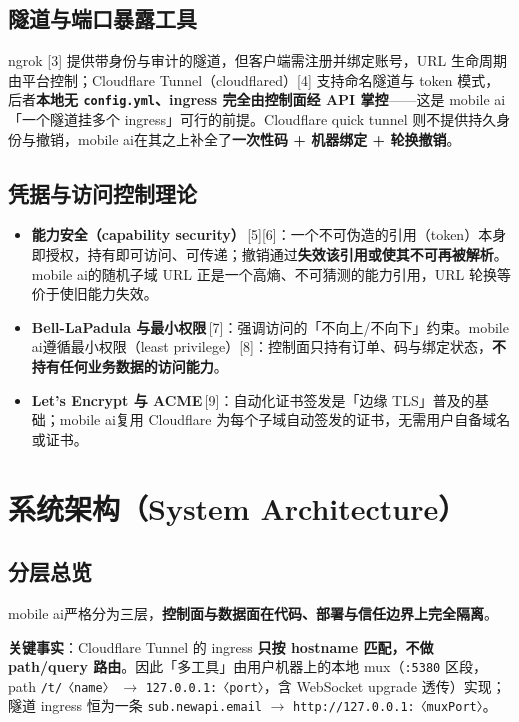 \documentclass[10pt,a4paper]{article}
\newcommand{\diagramfile}[1]{%
  \par\noindent\centering
  {\ttfamily\cjktt\tiny}%
  \par\vspace{0.5em}
}
\newcommand{\sys}{mobile ai}
\begin{document}
\subsection{隧道与端口暴露工具}
ngrok [3] 提供带身份与审计的隧道，但客户端需注册并绑定账号，URL 生命周期由平台控制；Cloudflare Tunnel（cloudflared）[4] 支持命名隧道与 token 模式，后者\textbf{本地无 \texttt{config.yml}、ingress 完全由控制面经 API 掌控}——这是 \sys「一个隧道挂多个 ingress」可行的前提。Cloudflare quick tunnel 则不提供持久身份与撤销，\sys 在其之上补全了\textbf{一次性码 + 机器绑定 + 轮换撤销}。

\subsection{凭据与访问控制理论}
\begin{itemize}[leftmargin=1.6em,itemsep=0.2em,topsep=0.2em]
  \item \textbf{能力安全（capability security）}\,[5][6]：一个不可伪造的引用（token）本身即授权，持有即可访问、可传递；撤销通过\textbf{失效该引用或使其不可再被解析}。\sys 的随机子域 URL 正是一个高熵、不可猜测的能力引用，URL 轮换等价于使旧能力失效。
  \item \textbf{Bell-LaPadula 与最小权限}\,[7]：强调访问的「不向上/不向下」约束。\sys 遵循最小权限（least privilege）[8]：控制面只持有订单、码与绑定状态，\textbf{不持有任何业务数据的访问能力}。
  \item \textbf{Let's Encrypt 与 ACME}\,[9]：自动化证书签发是「边缘 TLS」普及的基础；\sys 复用 Cloudflare 为每个子域自动签发的证书，无需用户自备域名或证书。
\end{itemize}

\section{系统架构（System Architecture）}

\subsection{分层总览}
\sys 严格分为三层，\textbf{控制面与数据面在代码、部署与信任边界上完全隔离}。

\diagramfile{diagram.verbatim}



\noindent\textbf{关键事实}：Cloudflare Tunnel 的 ingress \textbf{只按 hostname 匹配，不做 path/query 路由}。因此「多工具」由用户机器上的本地 mux（\texttt{:5380} 区段，path \texttt{/t/〈name〉} $\rightarrow$ \texttt{127.0.0.1:〈port〉}，含 WebSocket upgrade 透传）实现；隧道 ingress 恒为一条 \texttt{sub.newapi.email} $\rightarrow$ \texttt{http://127.0.0.1:〈muxPort〉}。
\end{document}
